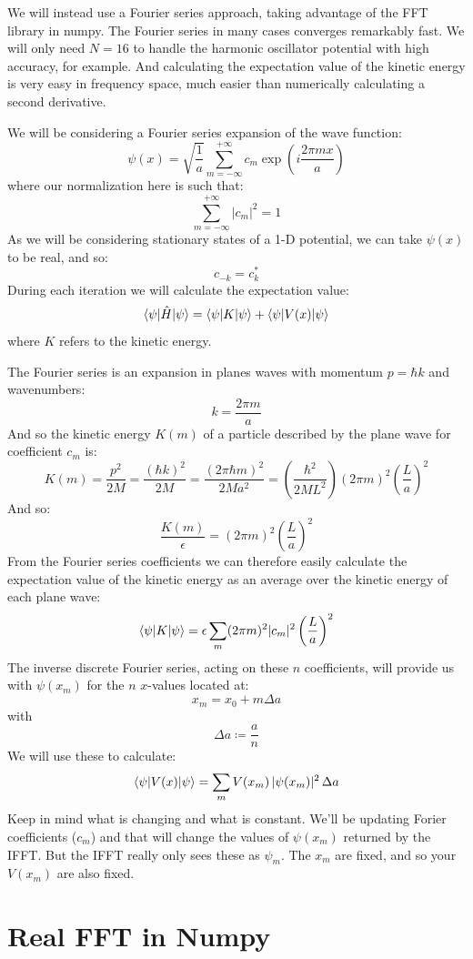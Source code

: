 \documentclass[12pt]{article}
\begin{document}
We will instead use a Fourier series approach, taking advantage of the
FFT library in numpy.  The Fourier series in many cases converges
remarkably fast.  We will only need $N=16$ to handle the harmonic
oscillator potential with high accuracy, for example.  And calculating
the expectation value of the kinetic energy is very easy in frequency
space, much easier than numerically calculating a second derivative.

We will be considering a Fourier series expansion of the wave function:
\begin{equation}
\label{eqn:fs}
\psi(x) = \sqrt{\frac{1}{a}} \sum_{m=-\infty}^{+\infty} c_m \exp(i\frac{2\pi m x}{a})
\end{equation}
where our normalization here is such that:
$$\sum_{m=-\infty}^{+\infty} |c_m|^2 = 1$$
As we will be considering stationary states of a 1-D potential, we can take $\psi(x)$ to be real, and so:
$$c_{-k} = c_k^*$$
During each iteration we will calculate the expectation value:
$$\braket{\psi|\hat{H}|\psi} = \braket{\psi|K|\psi} + \braket{\psi|V(x)|\psi}$$
where $K$ refers to the kinetic energy.

The Fourier series is an expansion in planes waves with momentum $p = \hbar k$ and wavenumbers:
$$k = \frac{2 \pi m}{a}$$
And so the kinetic energy $K(m)$ of a particle described by the plane wave for coefficient $c_m$ is:
$$ K(m) = \frac{p^2}{2M} = \frac{(\hbar k)^2}{2M}
= \frac{(2 \pi \hbar m)^2}{2Ma^2} = \left( \frac{\hbar^2}{2ML^2} \right) (2 \pi m)^2 \left( \frac{L}{a}\right)^2$$
And so:
$$\frac{K(m)}{\epsilon} = (2 \pi m)^2 \left( \frac{L}{a}\right)^2 $$
From the Fourier series coefficients we can therefore easily calculate the expectation value of the kinetic energy as an average over the kinetic energy of each plane wave:
$$\braket{\psi|K|\psi} = \epsilon \sum_m (2\pi m)^2 |c_m|^2 \left( \frac{L}{a}\right)^2 $$
The inverse discrete Fourier series, acting on these $n$ coefficients, will provide us with $\psi(x_m)$ for the $n$ $x$-values located at:
$$x_m = x_0 + m \Delta a$$
with
$$\Delta a \coloneqq \frac{a}{n}$$
We will use these to calculate:
$$\braket{\psi|V(x)|\psi} = \sum_m V(x_m) \, |\psi(x_m)|^2 \, \Delta a $$
Keep in mind what is changing and what is constant.  We'll be updating Forier coefficients ($c_m$) and that will change the values of $\psi(x_m)$ returned by the IFFT.  But the IFFT really only sees these as $\psi_m$.  The $x_m$ are fixed, and so your $V(x_m)$ are also fixed.

\section{Real FFT in Numpy}
\end{document}
